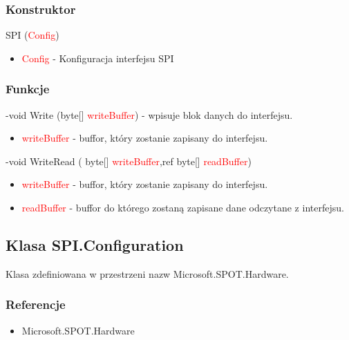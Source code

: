 \documentclass{article}
\begin{document}
\subsubsection{Konstruktor}
SPI (\textcolor{red}{Config})
\begin{itemize}
\item \textcolor{red}{Config} - Konfiguracja interfejsu SPI
\end{itemize}
\subsubsection{Funkcje}
-void Write (byte[] \textcolor{red}{writeBuffer}) - wpisuje blok danych do interfejsu.
\begin{itemize}
\item \textcolor{red}{writeBuffer} - buffor, który zostanie zapisany do interfejsu.
\end{itemize}
-void WriteRead ( byte[] \textcolor{red}{writeBuffer},ref byte[] \textcolor{red}{readBuffer})
\begin{itemize}
\item \textcolor{red}{writeBuffer} - buffor, który zostanie zapisany do interfejsu.
\item \textcolor{red}{readBuffer} - buffor do którego zostaną zapisane dane odczytane z \newline interfejsu.
\end{itemize}

\newpage
\subsection{Klasa SPI.Configuration}
Klasa zdefiniowana w przestrzeni nazw Microsoft.SPOT.Hardware. 
\subsubsection{Referencje}
\begin{itemize}
\item Microsoft.SPOT.Hardware
\end{itemize}
\end{document}
